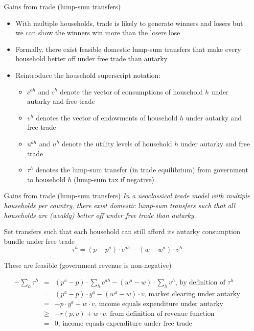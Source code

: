 \documentclass[11pt,notes=hide,aspectratio=169]{beamer}
\begin{document}
\begin{frame}{Gains from trade (lump-sum transfers)}
\begin{itemize}
\item With multiple households, trade is likely to generate winners and losers but we can show the winners win more than the losers lose
\item Formally, there exist feasible domestic lump-sum transfers that make every household better off under free trade than autarky
\item Reintroduce the household superscript notation:
\begin{itemize}
\item $c^{ah}$ and $c^{h}$ denote the vector of consumptions of household $h$ under autarky and free trade
\item $v^{h}$ denotes the vector of endowments of household $h$ under autarky and free trade
\item $u^{ah}$ and $u^{h}$ denote the utility levels of household $h$ under autarky and free trade
\item $\tau ^{h}$ denotes the lump-sum transfer (in trade equilibrium) from government to household $h$ (lump-sum tax if negative)
\end{itemize}
\end{itemize}
\end{frame}
\begin{frame}{Gains from trade (lump-sum transfers)}
\textit{In a neoclassical trade model with multiple households per country, there
exist domestic lump-sum transfers such that all households are (weakly)
better off under free trade than autarky.}
\begin{itemize}{\small
\item Set transfers such that each household can still afford its autarky
consumption bundle under free trade
\begin{equation*}
\tau ^{h}=\left( p-p^{a}\right) \cdot c^{ah}-\left( w-w^{a}\right) \cdot v^{h}
\end{equation*}
\item These are feasible (government revenue is non-negative)
}\end{itemize}
\begin{align*}
- \sum\nolimits_{h}\tau ^{h} &=&\left( p^{a}-p\right)  \cdot \sum\nolimits_{h}c^{ah}-\left(
w^{a}-w\right)  \cdot \sum\nolimits_{h}v^{h}\text{, by definition of }\tau ^{h} \\
&=&\left( p^{a}-p\right)  \cdot y^{a}-\left( w^{a}-w\right)  \cdot v\text{, market
clearing under autarky} \\
&=&-p \cdot y^{a}+w \cdot v\text{, income equals expenditure under autarky} \\
&\geq &-r\left( p,v\right) +w \cdot v\text{, from definition of revenue function}
\\
&=&0\text{, income equals expenditure under free trade}
\end{align*}
\end{frame}
\end{document}
